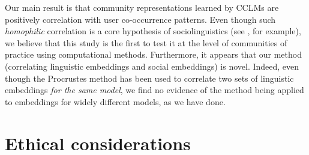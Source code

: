 \documentclass[11pt]{article}
\begin{document}


Our main result is that community representations learned by
CCLMs are positively correlation with user co-occurrence patterns.
Even though such \emph{homophilic} correlation is a core hypothesis of 
sociolinguistics (see \citet{Kovacs2020}, for example), 
we believe that this study is the first to test it at 
the level of communities of practice using computational methods.
Furthermore, it appears that our method (correlating
linguistic embeddings and social embeddings) is novel. Indeed, even
though the Procrustes method has been used to correlate two sets of
linguistic embeddings \emph{for the same model}, we find no evidence
of the method being applied to embeddings for widely different models,
as we have done.


\section{Ethical considerations}\label{sec:ethics}
\end{document}
